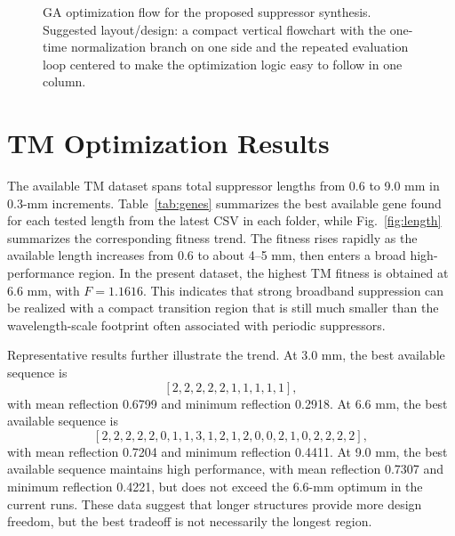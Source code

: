 \documentclass[journal]{IEEEtran}
\begin{document}
\begin{figure}[t]
\centering
{}
\caption{GA optimization flow for the proposed suppressor synthesis. Suggested layout/design: a compact vertical flowchart with the one-time normalization branch on one side and the repeated evaluation loop centered to make the optimization logic easy to follow in one column.}
\label{fig:flow}
\end{figure}

\section{TM Optimization Results}
The available TM dataset spans total suppressor lengths from 0.6 to 9.0 mm in 0.3-mm increments. Table~\ref{tab:genes} summarizes the best available gene found for each tested length from the latest CSV in each folder, while Fig.~\ref{fig:length} summarizes the corresponding fitness trend. The fitness rises rapidly as the available length increases from 0.6 to about 4--5 mm, then enters a broad high-performance region. In the present dataset, the highest TM fitness is obtained at 6.6 mm, with $F=1.1616$. This indicates that strong broadband suppression can be realized with a compact transition region that is still much smaller than the wavelength-scale footprint often associated with periodic suppressors.

Representative results further illustrate the trend. At 3.0 mm, the best available sequence is
\[
[2,2,2,2,2,1,1,1,1,1],
\]
with mean reflection 0.6799 and minimum reflection 0.2918. At 6.6 mm, the best available sequence is
\[
[2,2,2,2,2,0,1,1,3,1,2,1,2,0,0,2,1,0,2,2,2,2],
\]
with mean reflection 0.7204 and minimum reflection 0.4411. At 9.0 mm, the best available sequence maintains high performance, with mean reflection 0.7307 and minimum reflection 0.4221, but does not exceed the 6.6-mm optimum in the current runs. These data suggest that longer structures provide more design freedom, but the best tradeoff is not necessarily the longest region.
\end{document}
